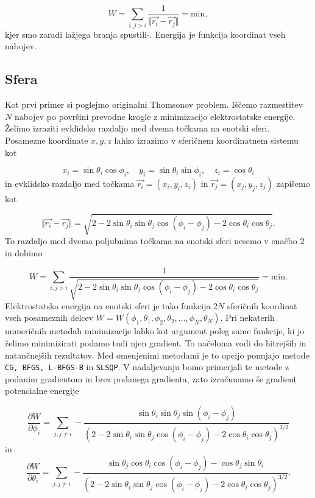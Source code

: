 \documentclass[slovene,11pt,a4paper]{article}
\begin{document}
\begin{equation}
W = \sum_{i, j>i} \frac{1}{\Vert \vec{r_i}-\vec{r_j} \Vert} = \text{min},
\end{equation}
kjer smo zaradi lažjega branja spustili $\tilde{}$. Energija je funkcija koordinat vseh nabojev.

\subsection{Sfera}

Kot prvi primer si poglejmo originalni Thomsonov problem. Iščemo razmestitev $N$ nabojev po površini prevodne krogle z minimizacijo elektrostatske energije. Želimo izraziti evklidsko razdaljo med dvema točkama na enotski sferi. Posamezne koordinate $x,y,z$ lahko izrazimo v sferičnem koordinatnem sistemu kot

\[
x_i = \sin\theta_i \cos\phi_i, \quad y_i = \sin\theta_i \sin\phi_i, \quad z_i = \cos\theta_i
\]
in evklidsko razdaljo med točkama $\vec{r_i} = (x_i, y_i, z_i)$ in $\vec{r_j} = (x_j, y_j, z_j)$ zapišemo kot

\begin{equation}
\Vert\vec{r_i}-\vec{r_j}\Vert = \sqrt{2-2\sin\theta_i\sin\theta_j\cos(\phi_i-\phi_j) - 2\cos\theta_i \cos\theta_j}.
\end{equation}
To razdaljo med dvema poljubnima točkama na enotski sferi nesemo v enačbo 2 in dobimo

\begin{equation}
W = \sum_{i, j>i} \frac{1}{\sqrt{2-2\sin\theta_i\sin\theta_j\cos(\phi_i-\phi_j) - 2\cos\theta_i \cos\theta_j}} = \text{min}.
\end{equation}
Elektrostatska energija na enotski sferi je tako funkcija $2N$ sferičnih koordinat vseh posameznih delcev $W = W(\phi_1, \theta_1, \phi_2, \theta_2,..., \phi_N, \theta_N)$. Pri nekaterih numeričnih metodah minimizacije lahko kot argument poleg same funkcije, ki jo želimo minimizirati podamo tudi njen gradient. To načeloma vodi do hitrejših in natančnejših rezultatov. Med omenjenimi metodami je to opcijo ponujajo metode \texttt{CG, BFGS, L-BFGS-B} in \texttt{SLSQP}. V nadaljevanju bomo primerjali te metode z podanim gradientom in brez podanega gradienta, zato izračunamo še gradient potencialne energije

\begin{equation}
\frac{\partial W}{\partial \phi_i} = \sum_{j, j\neq i} - \frac{\sin\theta_i \sin\theta_j \sin(\phi_i-\phi_j)}{(2-2\sin\theta_i \sin\theta_j \cos(\phi_i-\phi_j)-2\cos\theta_i \cos\theta_j)^{3/2}}
\end{equation}
in
\begin{equation}
\frac{\partial W}{\partial \theta_i} = \sum_{j, j\neq i} - \frac{\sin\theta_j \cos\theta_i \cos(\phi_i-\phi_j) - \cos\theta_j \sin\theta_i}{(2-2\sin\theta_i \sin\theta_j \cos(\phi_i-\phi_j)-2\cos\theta_i \cos\theta_j)^{3/2}}.
\end{equation}
\end{document}
